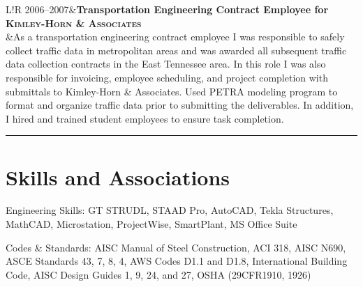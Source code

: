 \documentclass[11pt,letterpaper]{article}
\newcommand\VRule{\color{lightgray}\vrule width 0.5pt}
\begin{document}
\begin{tabular}{L!{\VRule}R}
2006--2007&{\bf Transportation Engineering Contract Employee for \fontsize{12}{12}\textsc{Kimley-Horn \& Associates}}\\
&As a transportation engineering contract employee I was responsible to safely collect traffic data in metropolitan areas and was awarded all subsequent traffic data collection contracts in the East Tennessee area.  In this role I was also responsible for invoicing, employee scheduling, and project completion with submittals to Kimley-Horn \& Associates.  Used PETRA modeling program to format and organize traffic data prior to submitting the deliverables.  In addition, I hired and trained student employees to ensure task completion.
\end{tabular}
\vspace{1em} 
\hrule
\vspace{-0.4em}

\section*{Skills and Associations}

\begin{description*}
	\item[Engineering Skills:]
	GT STRUDL, STAAD Pro, AutoCAD, Tekla Structures, MathCAD, Microstation, ProjectWise, SmartPlant, MS Office Suite
	\\[5pt]
	\item[Codes \& Standards:]
	AISC Manual of Steel Construction, ACI 318, AISC N690, ASCE Standards 43, 7, 8, 4, AWS Codes D1.1 and D1.8, International Building Code, AISC Design Guides 1, 9, 24, and 27, OSHA (29CFR1910, 1926)
	\end{description*}
\end{document}
